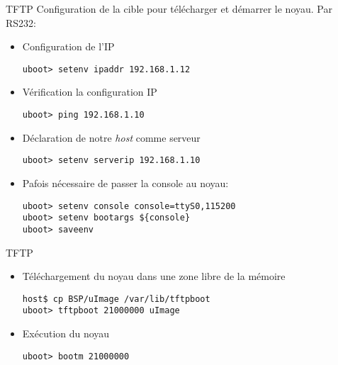 \begin{frame}[fragile=singleslide]{TFTP}
  Configuration de la cible pour télécharger et démarrer le noyau. Par RS232:
  \begin{itemize}
  \item Configuration de l'IP
    \begin{lstlisting}
uboot> setenv ipaddr 192.168.1.12
    \end{lstlisting}
  \item Vérification la configuration IP
    \begin{lstlisting}
uboot> ping 192.168.1.10
    \end{lstlisting}
  \item Déclaration de notre \emph{host} comme serveur 
    \begin{lstlisting}
uboot> setenv serverip 192.168.1.10
    \end{lstlisting}
 \item Pafois nécessaire de passer la console au noyau:
    \begin{lstlisting}
uboot> setenv console console=ttyS0,115200
uboot> setenv bootargs ${console}
uboot> saveenv
    \end{lstlisting}
  \end{itemize}
\end{frame}

\begin{frame}[fragile=singleslide]{TFTP}
  \begin{itemize}
  \item Téléchargement du noyau dans une zone libre de la mémoire
    \begin{lstlisting}
host$ cp BSP/uImage /var/lib/tftpboot
uboot> tftpboot 21000000 uImage
    \end{lstlisting}
  \item Exécution du noyau
    \begin{lstlisting}
uboot> bootm 21000000
    \end{lstlisting}
  \end{itemize}
\end{frame}

